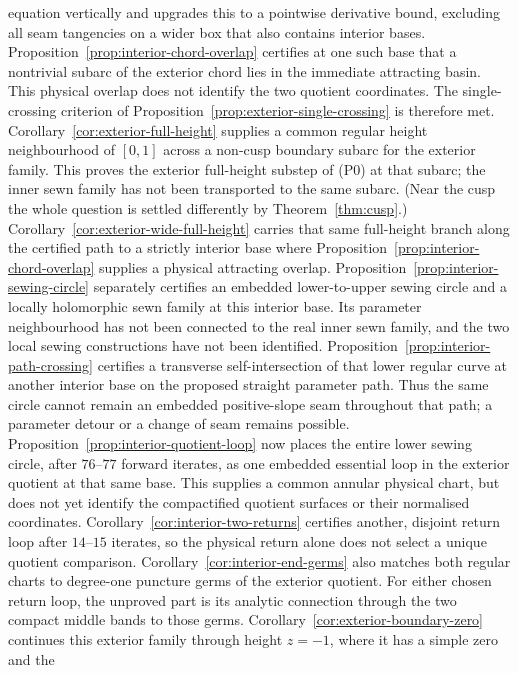 \documentclass[11pt]{amsart}
\theoremstyle{definition}
\begin{document}
equation vertically and upgrades this to a pointwise derivative
bound, excluding all seam tangencies on a wider box that also
contains interior bases.
Proposition~\ref{prop:interior-chord-overlap} certifies at one such
base that a nontrivial subarc of the exterior chord lies in the
immediate attracting basin.  This physical overlap does not
identify the two quotient coordinates.
The single-crossing criterion of
Proposition~\ref{prop:exterior-single-crossing} is therefore met.
Corollary~\ref{cor:exterior-full-height} supplies a common regular
height neighbourhood of $[0,1]$ across a non-cusp boundary subarc
for the exterior family.  This proves the exterior full-height
substep of (P0) at that subarc; the inner sewn family has not been
transported to the same subarc.  (Near the cusp the whole question is
settled differently by Theorem~\ref{thm:cusp}.)
Corollary~\ref{cor:exterior-wide-full-height} carries that same
full-height branch along the certified path to a strictly interior
base where Proposition~\ref{prop:interior-chord-overlap} supplies a
physical attracting overlap.
Proposition~\ref{prop:interior-sewing-circle} separately certifies an
embedded lower-to-upper sewing circle and a locally holomorphic sewn
family at this interior base.  Its parameter neighbourhood has not
been connected to the real inner sewn family, and the two local
sewing constructions have not been identified.
Proposition~\ref{prop:interior-path-crossing} certifies a transverse
self-intersection of that lower regular curve at another interior base
on the proposed straight parameter path.  Thus the same circle cannot
remain an embedded positive-slope seam throughout that path; a
parameter detour or a change of seam remains possible.
Proposition~\ref{prop:interior-quotient-loop} now places the entire
lower sewing circle, after $76$--$77$ forward iterates, as one
embedded essential loop in the exterior quotient at that same base.
This supplies a common annular physical chart, but does not yet
identify the compactified quotient surfaces or their normalised
coordinates.
Corollary~\ref{cor:interior-two-returns} certifies another,
disjoint return loop after $14$--$15$ iterates, so the physical
return alone does not select a unique quotient comparison.
Corollary~\ref{cor:interior-end-germs} also matches both regular
charts to degree-one puncture germs of the exterior quotient.
For either chosen return loop, the unproved part is its analytic
connection through the two compact middle bands to those germs.
Corollary~\ref{cor:exterior-boundary-zero} continues this exterior
family through height $z=-1$, where it has a simple zero and the
\end{document}
